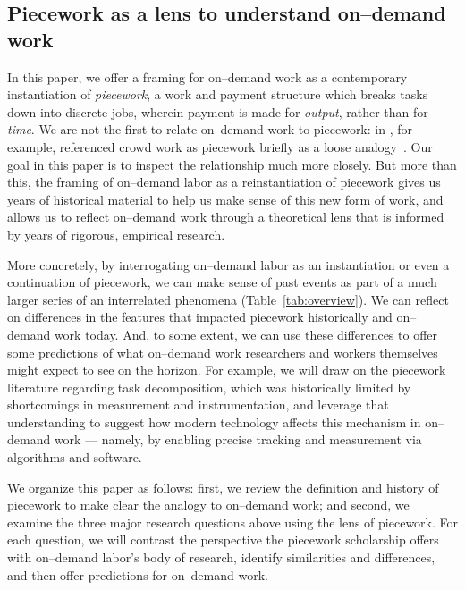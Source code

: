 \documentclass[trackingWork]{subfiles}
\begin{document}
\subsection{Piecework as a lens to understand on--demand work}
In this paper, we offer a framing for on--demand work as a contemporary instantiation of \textit{piecework},
a work and payment structure which breaks tasks down into discrete jobs,
wherein payment is made for \textit{output}, rather than for \textit{time}.
We are not the first to relate on--demand work to piecework: in \citeyear{crowdworkFuture}, for example,
\citeauthor{crowdworkFuture} referenced crowd work as piecework briefly
as a loose analogy~\cite{crowdworkFuture}.
Our goal in this paper is to inspect the relationship much more closely.
But more than this,
the framing of on--demand labor as a reinstantiation of piecework 
gives us years of historical material to help us make sense of this new form of work, and
allows us to reflect on--demand work through a theoretical lens that is informed by years of rigorous, empirical research.

More concretely, by interrogating on--demand labor as
an instantiation or even a continuation of piecework, we can make sense of past events as part of a much larger series of an interrelated phenomena (Table~\ref{tab:overview}).
We can reflect on differences in the features that impacted piecework historically and on--demand work today.
And, to some extent, we can use these differences to offer some predictions of what on--demand work researchers
and workers themselves
might expect to see on the horizon.
For example, we will draw on the piecework literature regarding task decomposition,
which was historically limited by shortcomings in measurement and instrumentation, and
leverage that understanding to suggest how modern technology affects this mechanism in on--demand work
--- namely, by enabling precise tracking and measurement via algorithms and software.

We organize this paper as follows:
first, we review the definition and history of piecework
to make clear the analogy to on--demand work;
and second, we examine the three major research questions above using the lens of piecework. 
For each question, we will
contrast the perspective the piecework scholarship offers with on--demand labor's body of research,
identify similarities and differences, and then
offer predictions for on--demand work.

\onlyinsubfile{
  \printbibliography
}
\end{document}
